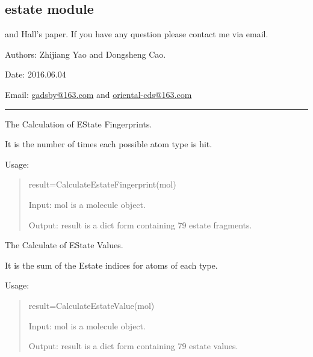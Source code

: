\documentclass[letterpaper,10pt,english]{sphinxmanual}
\begin{document}
\subsection{estate module}
\label{reference/estate:estate-module}\label{reference/estate:module-estate}\label{reference/estate::doc}
and Hall's paper. If you have any question please contact me via email.

Authors: Zhijiang Yao and Dongsheng Cao.

Date: 2016.06.04

Email: \href{mailto:gadsby@163.com}{gadsby@163.com} and \href{mailto:oriental-cds@163.com}{oriental-cds@163.com}


\bigskip\hrule{}\bigskip


\begin{fulllineitems}
\label{reference/estate:estate.CalculateEstateFingerprint}
The Calculation of EState Fingerprints.

It is the number of times each possible atom type is hit.

Usage:
\begin{quote}

result=CalculateEstateFingerprint(mol)

Input: mol is a molecule object.

Output: result is a dict form containing 79 estate fragments.
\end{quote}

\end{fulllineitems}


\begin{fulllineitems}
\label{reference/estate:estate.CalculateEstateValue}
The Calculate of EState Values.

It is the sum of the Estate indices for atoms of each type.

Usage:
\begin{quote}

result=CalculateEstateValue(mol)

Input: mol is a molecule object.

Output: result is a dict form containing 79 estate values.
\end{quote}

\end{fulllineitems}
\end{document}
